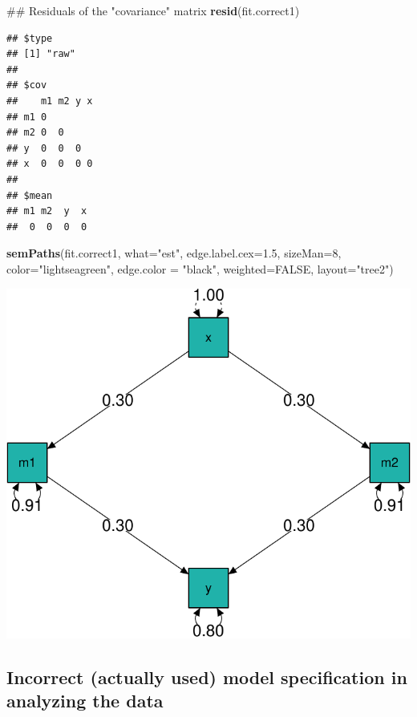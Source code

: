 \documentclass[]{article}
\newenvironment{Shaded}{\begin{snugshade}}{\end{snugshade}}
\newcommand{\KeywordTok}[1]{\textcolor[rgb]{0.13,0.29,0.53}{\textbf{#1}}}
\newcommand{\DataTypeTok}[1]{\textcolor[rgb]{0.13,0.29,0.53}{#1}}
\newcommand{\DecValTok}[1]{\textcolor[rgb]{0.00,0.00,0.81}{#1}}
\newcommand{\FloatTok}[1]{\textcolor[rgb]{0.00,0.00,0.81}{#1}}
\newcommand{\StringTok}[1]{\textcolor[rgb]{0.31,0.60,0.02}{#1}}
\newcommand{\OtherTok}[1]{\textcolor[rgb]{0.56,0.35,0.01}{#1}}
\newcommand{\NormalTok}[1]{#1}
\begin{document}
\begin{Shaded}
\begin{Highlighting}[]
\NormalTok{## Residuals of the "covariance" matrix}
\KeywordTok{resid}\NormalTok{(fit.correct1)}
\end{Highlighting}
\end{Shaded}

\begin{verbatim}
## $type
## [1] "raw"
## 
## $cov
##    m1 m2 y x
## m1 0        
## m2 0  0     
## y  0  0  0  
## x  0  0  0 0
## 
## $mean
## m1 m2  y  x 
##  0  0  0  0
\end{verbatim}

\begin{Shaded}
\begin{Highlighting}[]
\KeywordTok{semPaths}\NormalTok{(fit.correct1, }\DataTypeTok{what=}\StringTok{"est"}\NormalTok{, }\DataTypeTok{edge.label.cex=}\FloatTok{1.5}\NormalTok{, }
         \DataTypeTok{sizeMan=}\DecValTok{8}\NormalTok{, }\DataTypeTok{color=}\StringTok{"lightseagreen"}\NormalTok{, }\DataTypeTok{edge.color =} \StringTok{"black"}\NormalTok{, }
         \DataTypeTok{weighted=}\OtherTok{FALSE}\NormalTok{, }\DataTypeTok{layout=}\StringTok{"tree2"}\NormalTok{)}
\end{Highlighting}
\end{Shaded}

\includegraphics{Supplemental_materials_3_files/figure-latex/unnamed-chunk-4-1.pdf}

\subsection{Incorrect (actually used) model specification in analyzing
the
data}\label{incorrect-actually-used-model-specification-in-analyzing-the-data}
\end{document}
